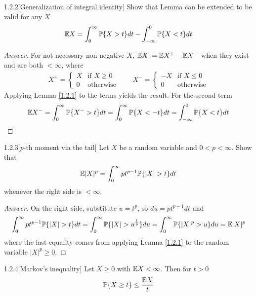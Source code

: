 \begin{ex}{1.2.2}[Generalization of integral identity]\label{1.2.2}
Show that Lemma  can be extended to be valid for any $X$
\begin{align*}
    \mathbb{E} X = \int^\infty_0 \mathbb{P}\{X >t\} dt - \int^0_{-\infty} \mathbb{P}\{X < t\} dt
\end{align*}
\end{ex}
\begin{proof}[Answer]
For not necessary non-negative $X$, $\mathbb{E} X := \mathbb{E} X^+ - \mathbb{E} X^-$ when they exist and are both $< \infty$, where
\begin{align*}
    X^+ = \begin{cases}
            X &\text{if } X\geq0 \\
            0 &\text{otherwise}
    \end{cases}\qquad
    X^- = \begin{cases}
            -X &\text{if } X\leq0 \\
            0 &\text{otherwise}
    \end{cases}
\end{align*}
Applying Lemma \ref{1.2.1} to the terms yields the result. For the second term
\begin{align*}
    \mathbb{E} X^- = \int^\infty_0 \mathbb{P}\{X^- > t\} dt = \int^\infty_0\mathbb{P}\{X < -t\} dt = \int^0_{-\infty}\mathbb{P}\{X < t\} dt
\end{align*}
\end{proof}

\begin{ex}{1.2.3}[$p$-th moment via the tail]\label{1.2.3}
Let $X$ be a random variable and $0 < p < \infty$. Show that
\begin{align*}
    \E |X|^p = \int^\infty_0 pt^{p-1}\P\{|X|>t\} dt
\end{align*}
whenever the right side is $<\infty$.
\end{ex}
\begin{proof}[Answer]
On the right side, substitute $u = t^p$, so $du = pt^{p-1} dt$ and
\begin{align*}
    \int^\infty_0 pt^{p-1}\P\{|X|>t\} dt = \int^\infty_0 \P\{|X|>u^{\frac1p}\} du = \int^\infty_0 \P\{|X|^p>u\} du = \E |X|^p
\end{align*}
where the last equality comes from applying Lemma \ref{1.2.1} to the random variable $|X|^p \geq 0$.
\end{proof}

\begin{prop}{1.2.4}[Markov's inequality]\label{1.2.4}
Let $X \geq 0$ with $\mathbb{E} X < \infty$. Then for $t > 0$
\begin{align*}
    \mathbb{P} \{ X \geq t\} \leq \frac{\mathbb{E} X} t
\end{align*}
\end{prop}

